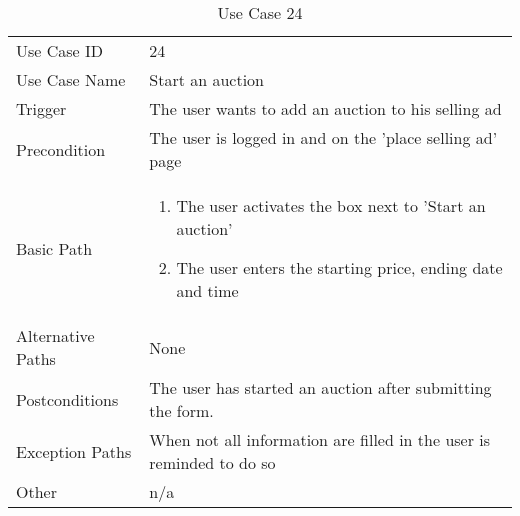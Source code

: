 \begin{table}[H]
\centering
\label{table-use-case-24}
\begin{tabular}{|p{3cm}|p{10cm}}
Use Case ID       & 24                                                      \\
Use Case Name     & Start an auction                            \\
Trigger           & The user wants to add an auction to his selling ad\\
Precondition      & The user is logged in and on the 'place selling ad' page
\\
Basic Path        & \begin{enumerate}
\item		The user activates the box next to 'Start an auction'
\item             The user enters the starting price, ending date and time

\end{enumerate} 
     \\
Alternative Paths & None                          \\
Postconditions    & The user has started an auction after submitting the form.\\
Exception Paths   & When not all information are filled in the user is reminded to do so			\\
Other             & n/a                                                                                                                                                                                                        
\end{tabular}
\caption{Use Case 24}
\end{table}


